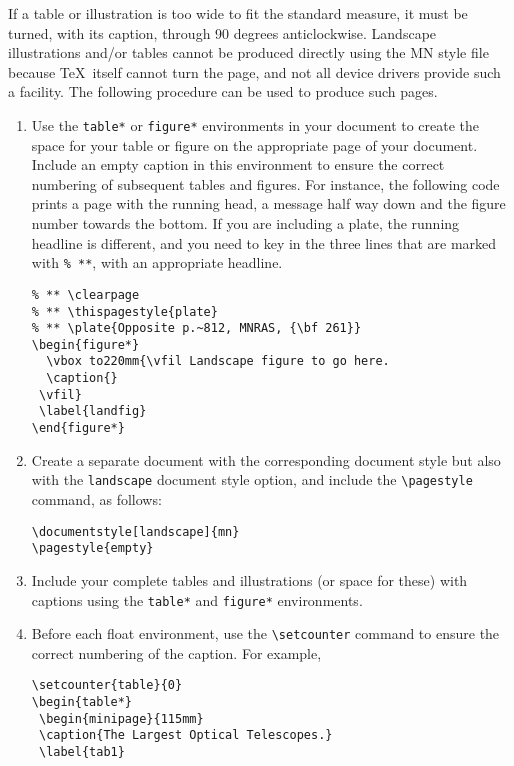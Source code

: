 If a table or illustration is too wide to fit the standard measure, it
must be turned, with its caption, through 90 degrees anticlockwise. 
Landscape illustrations and/or tables cannot be produced directly
using the MN style file because \TeX\ itself cannot turn the
page, and not all device drivers provide such a facility.
The following procedure can be used to produce such pages.
%
\begin{enumerate}
  \item Use the \verb"table*" or \verb"figure*" environments in your
        document to create the space for your table or figure on the
        appropriate page of your document. Include an empty 
        caption in this environment to ensure the correct
        numbering of subsequent tables and figures. For instance, the 
        following code prints a page with the running head, a message
        half way down and the figure number towards the bottom. If you 
        are including a plate, the running headline is different, and you
        need to key in the three lines that are marked with \verb"% **",
        with an appropriate headline.
%
\begin{verbatim}
% ** \clearpage 
% ** \thispagestyle{plate}
% ** \plate{Opposite p.~812, MNRAS, {\bf 261}}
\begin{figure*}
  \vbox to220mm{\vfil Landscape figure to go here.
  \caption{}
 \vfil}
 \label{landfig}
\end{figure*}
\end{verbatim}
%
\item Create a separate document with the corresponding document style
      but also with the \verb"landscape" document style option, and 
      include the \verb"\pagestyle" command, as follows:
%
\begin{verbatim}
\documentstyle[landscape]{mn}
\pagestyle{empty}
\end{verbatim}
%
  \item Include your complete tables and illustrations (or space for
        these) with captions using the \verb"table*" and \verb"figure*"
        environments.  
  \item Before each float environment, use the 
        \verb"\setcounter" command to ensure the correct numbering of 
        the caption. For example,
%
\begin{verbatim}
\setcounter{table}{0}
\begin{table*}
 \begin{minipage}{115mm}
 \caption{The Largest Optical Telescopes.}
 \label{tab1}

\end{verbatim}
\end{enumerate}
